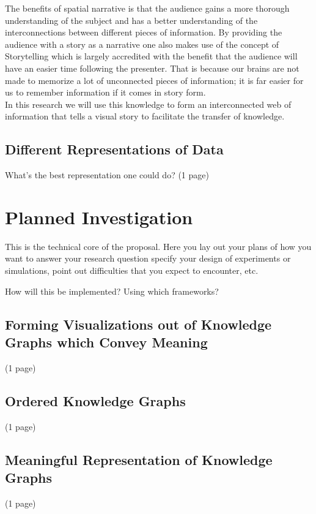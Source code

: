 \documentclass[twoside]{article}
\begin{document}
The benefits of spatial narrative is that the audience gains a more thorough understanding of the subject and has a better understanding of the interconnections between different pieces of information. By providing the audience with a story as a narrative one also makes use of the concept of Storytelling which is largely accredited with the benefit that the audience will have an easier time following the presenter. That is because our brains are not made to memorize a lot of unconnected pieces of information; it is far easier for us to remember information if it comes in story form. \\

In this research we will use this knowledge to form an interconnected web of information that tells a visual story to facilitate the transfer of knowledge.

\subsection{Different Representations of Data}
What's the best representation one could do?
(1 page)


\section{Planned Investigation}

  This is the technical core of the proposal. Here you lay out your
  plans of how you want to answer your research question specify your
  design of experiments or simulations, point out difficulties that
  you expect to encounter, etc.

How will this be implemented?
Using which frameworks?
  

\subsection{Forming Visualizations out of Knowledge Graphs which Convey Meaning}
(1 page)
\newpage

\subsection{Ordered Knowledge Graphs}
(1 page)
\newpage

\subsection{Meaningful Representation of Knowledge Graphs}
(1 page)
\end{document}
